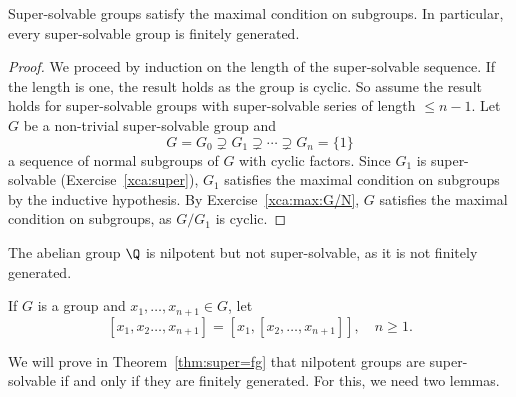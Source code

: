 \begin{proposition}
\label{pro:superfg}
Super-solvable groups satisfy the maximal condition on subgroups. In particular, 
every super-solvable group is finitely generated. 
\end{proposition}

\begin{proof}
We proceed by induction on the length of the super-solvable sequence. If the length
is one, the result holds as the group is cyclic. 
So assume the result holds for super-solvable groups with 
super-solvable series of length $\leq n-1$.  Let $G$
be a non-trivial super-solvable group and 
	\[
	G=G_0\supsetneq
	G_1\supsetneq\cdots\supsetneq G_n=\{1\}
	\]
a sequence of normal subgroups of $G$ with cyclic factors. Since 
$G_{1}$ is super-solvable (Exercise~\ref{xca:super}),
	$G_{1}$ satisfies the maximal condition on subgroups by the inductive
 hypothesis. By Exercise~\ref{xca:max:G/N}, $G$ satisfies the maximal
 condition on subgroups, as 
 $G/G_{1}$ is cyclic. 
\end{proof}

%

\begin{example}
The abelian group $\Q$ is nilpotent but not super-solvable, 
as it is not finitely generated. 
\end{example}


If $G$ is a group and $x_1,\dots,x_{n+1}\in G$, 
let 
\[
[x_1,x_2\dots,x_{n+1}]=\left[ x_1,[x_2,\dots,x_{n+1}]\right],\quad
n\geq1.
\]

We will prove in Theorem~\ref{thm:super=fg} that nilpotent groups are super-solvable 
if and only if they are finitely generated. For this, we need two lemmas. 

